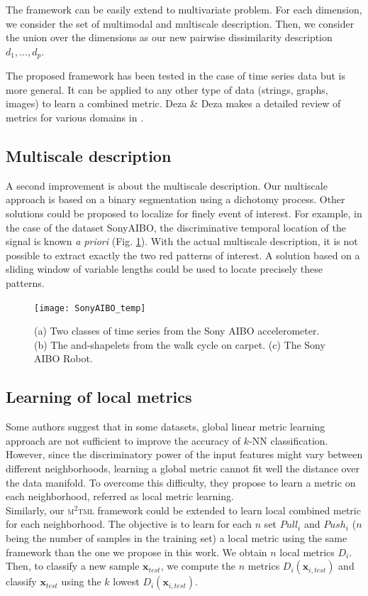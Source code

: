 \noindent The framework can be easily extend to multivariate problem. For each dimension, we consider the set of multimodal and multiscale description. Then,  we consider the union over the dimensions as our new pairwise dissimilarity description $d_1, \ldots, d_p$. 

\noindent The proposed framework has been tested in the case of time series data but is more general. It can be applied to any other type of data (strings, graphs, images) to learn a combined metric. Deza \& Deza makes a detailed review of metrics for various domains in \cite{Deza2009}.


\subsection*{Multiscale description}
A second improvement is about the multiscale description. Our multiscale approach is based on a binary segmentation using a dichotomy process. Other solutions could be proposed to localize for finely event of interest. For example, in the case of the dataset SonyAIBO, the discriminative temporal location of the signal is known \textit{a priori} (Fig. \ref{fig:SonyAIBO_tmp}). With the actual multiscale description, it is not possible to extract exactly the two red patterns of interest. A solution based on a sliding window of variable lengths could be used to locate precisely these patterns. 

\begin{figure}[h!]
	\centering
	\texttt{[image: SonyAIBO\_temp]}
	\caption{(a) Two classes of time series from the Sony AIBO accelerometer. (b) The and-shapelets from the walk cycle on carpet. (c) The Sony AIBO Robot.\protect\footnotemark}
	\label{fig:SonyAIBO_tmp}
\end{figure}

\subsection*{Learning of local metrics}
Some authors \cite{Weinberger2009a, Wang2012} suggest that in some datasets, global linear metric learning approach are not sufficient to improve the accuracy of $k$-NN classification. However, since the discriminatory power of the input features might vary between different neighborhoods, learning a global metric cannot fit well the distance over the data manifold. To overcome this difficulty, they propose to learn a metric on each neighborhood, referred as local metric learning. \\
Similarly, our \textsc{m$^2$tml} framework could be extended to learn local combined metric for each neighborhood. The objective is to learn for each $n$ set $Pull_i$ and $Push_i$ ($n$ being the number of samples in the training set) a local metric using the same framework than the one we propose in this work. We obtain $n$ local metrics $D_i$. Then, to classify a new sample $\textbf{x}_{test}$, we compute the $n$ metrics $D_i(\textbf{x}_{i,test})$ and classify $\textbf{x}_{test}$ using the $k$ lowest $D_i(\textbf{x}_{i,test})$.



